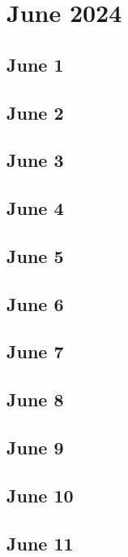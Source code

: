 %
%
%

\chapter{June 2024}
\label{intro} %

\section{June 1}

\section{June 2}

\section{June 3}

\section{June 4}

\section{June 5}

\section{June 6}

\section{June 7}

\section{June 8}

\section{June 9}

\section{June 10}

\section{June 11}

